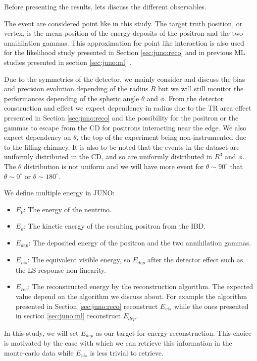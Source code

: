 \documentclass[../main.tex]{subfiles}
\begin{document}
{{Before presenting the results, lets discuss the different observables.

The event are considered point like in this study. The target truth position, or vertex, is the mean position of the energy deposits of the positron and the two annihilation gammas. This approximation for point like interaction is also used for the likelihood study presented in Section \ref{sec:juno:reco} and in previous ML studies presented in section \ref{sec:juno:ml} \cite{qian_vertex_2021}.

Due to the symmetries of the detector, we mainly consider and discuss the bias and precision evolution depending of the radius $R$ but we will still monitor the performances depending of the spheric angle $\theta$ and $\phi$. From the detector construction and effect we expect dependency in radius due to the TR area effect presented in Section \ref{sec:juno:reco} and the possibility for the positron or the gammas to escape from the CD for positrons interacting near the edge. We also expect dependency on $\theta$, the top of the experiment being non-instrumented due to the filling chimney. It is also to be noted that the events in the dataset are uniformly distributed in the CD, and so are uniformly distributed in $R^3$ and $\phi$. The $\theta$ distribution is not uniform and we will have more event for $\theta \sim 90^{\circ}$ that $\theta \sim 0^{\circ}$ or $\theta \sim 180^{\circ}$.

We define multiple energy in JUNO:
\begin{itemize}
  \item $E_\nu$: The energy of the neutrino.
  \item $E_k$: The kinetic energy of the resulting positron from the IBD.
  \item $E_{dep}$: The deposited energy of the positron and the two annihilation gammas.
  \item $E_{vis}$: The equivalent visible energy, so $E_{dep}$ after the detector effect such as the LS response non-linearity.
  \item $E_{rec}$: The reconstructed energy by the reconstruction algorithm. The expected value depend on the algorithm we discuss about. For example the algorithm presented in Section \ref{sec:juno:reco} reconstruct $E_{vis}$ while the ones presented in section \ref{sec:juno:ml} reconstruct $E_{dep}$.
\end{itemize}

In this study, we will set $E_{dep}$ as our target for energy reconstruction. This choice is motivated by the ease with which we can retrieve this information in the monte-carlo data while $E_{vis}$ is less trivial to retrieve.

}}
\end{document}
